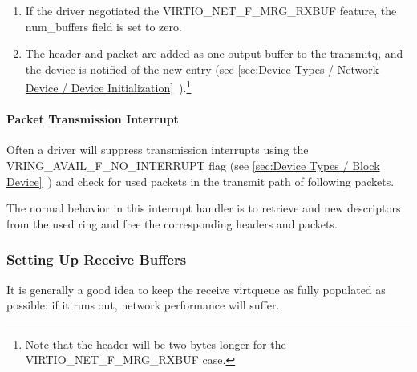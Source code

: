 \begin{enumerate}
\begin{itemize}
  \item gso_size is the maximum size of each packet beyond that
    header (ie. MSS).

  \item If the driver negotiated the VIRTIO_NET_F_HOST_ECN feature,
    the VIRTIO_NET_HDR_GSO_ECN bit may be set in “gso_type” as
    well, indicating that the TCP packet has the ECN bit set.\footnote{This case is not handled by some older hardware, so is called out
specifically in the protocol.
}
   \end{itemize}

\item If the driver negotiated the VIRTIO_NET_F_MRG_RXBUF feature,
  the num_buffers field is set to zero.

\item The header and packet are added as one output buffer to the
  transmitq, and the device is notified of the new entry
  (see \ref{sec:Device Types / Network Device / Device Initialization}~).\footnote{Note that the header will be two bytes longer for the
VIRTIO_NET_F_MRG_RXBUF case.
}
\end{enumerate}

\paragraph{Packet Transmission Interrupt}\label{sec:Device Types / Network Device / Device Operation / Packet Transmission / Packet Transmission Interrupt}

Often a driver will suppress transmission interrupts using the
VRING_AVAIL_F_NO_INTERRUPT flag
 (see \ref{sec:Device Types / Block Device}~)
and check for used packets in the transmit path of following
packets.

The normal behavior in this interrupt handler is to retrieve and
new descriptors from the used ring and free the corresponding
headers and packets.

\subsubsection{Setting Up Receive Buffers}\label{sec:Device Types / Network Device / Device Operation / Setting Up Receive Buffers}

It is generally a good idea to keep the receive virtqueue as
fully populated as possible: if it runs out, network performance
will suffer.

